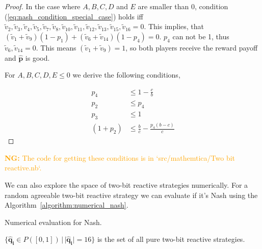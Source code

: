 \documentclass{article}
\theoremstyle{definition}
\newcommand{\nikoleta}[1]{\textcolor{orange}{{\bf NG:} #1}}
\begin{document}
\begin{proof}
In the case where \(A, B, C, D\) and \(E\) are smaller than 0, condition
(\ref{eq:nash_condition_special_case}) holds iff \(\tilde{v}_2, \tilde{v}_3,
\tilde{v}_4, \tilde{v}_5, \tilde{v}_7, \tilde{v}_8, \tilde{v}_{10},
\tilde{v}_{11}, \tilde{v}_{12}, \tilde{v}_{13}, \tilde{v}_{15}, \tilde{v}_{16} =
0\). This implies, that \((\tilde{v}_1 + \tilde{v}_9) (1 - p_1) + (\tilde{v}_6 +
\tilde{v}_{14}) (1 - p_4) = 0\). \(p_4\) can not be 1, thus \(\tilde{v}_6,
\tilde{v}_{14} = 0\). This means \((\tilde{v}_1 + \tilde{v}_9) = 1\), so both
players receive the reward payoff and \(\mathbf{\hat{p}}\) is good.

For \(A, B, C, D, E \leq 0\) we derive the following conditions,

\begin{align}\label{eq:nash_conditions}
  p_4       & \leq 1 - \frac{c}{b} \\
  p_2       & \leq p_4 \\
  p_3       & \leq 1 \\
  (1 + p_2) & \leq \frac{b}{c} - \frac{p_4 (b - c)}{c}
\end{align}

\end{proof}

\nikoleta{The code for getting these conditions is in `src/mathemtica/Two bit reactive.nb`.}

We can also explore the space of two-bit reactive strategies numerically. For a
random agreeable two-bit reactive strategy we can evaluate if it's Nash using
the Algorithm~\ref{algorithm:numerical_nash}.

\begin{algorithm}[H]
  \SetAlgoLined {}
  \caption{Numerical evaluation for Nash.}\label{algorithm:numerical_nash}
\end{algorithm}

\(\{\mathbf{\hat{q}_i} \in P([0, 1]) \,|\, |\mathbf{\hat{q}_i}| = 16 \}\) is
the set of all pure two-bit reactive strategies.
\end{document}
